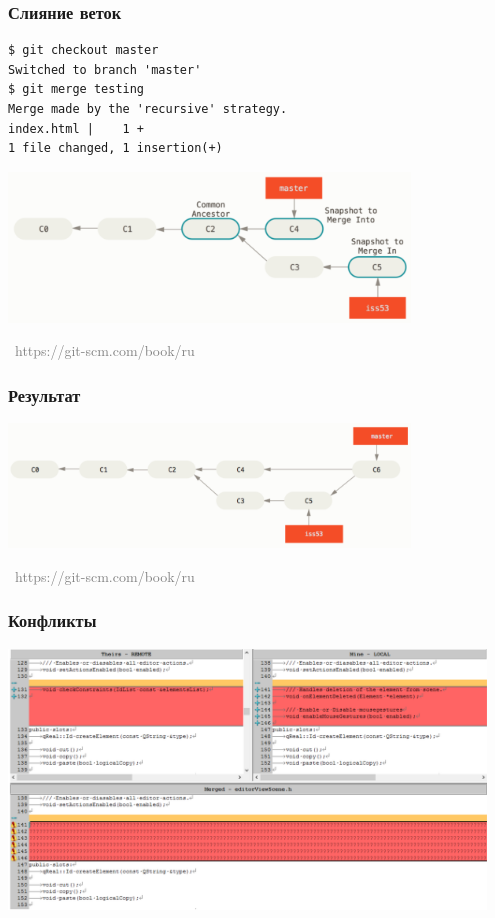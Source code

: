 \documentclass[xetex,mathserif,serif]{beamer}
\newcommand{\attribution}[1] {
\vspace{-5mm}\begin{flushright}\begin{scriptsize}\textcolor{gray}{\textcopyright\, #1}\end{scriptsize}\end{flushright}
}
\begin{document}
	\begin{frame}[fragile]
		\frametitle{Слияние веток}
		\begin{verbatim}
$ git checkout master
Switched to branch 'master'
$ git merge testing
Merge made by the 'recursive' strategy.
index.html |    1 +
1 file changed, 1 insertion(+)
		\end{verbatim}
		\begin{center}
			\includegraphics[width=0.8\textwidth]{merge.png}
			\attribution{https://git-scm.com/book/ru}
		\end{center}
	\end{frame}

	\begin{frame}
		\frametitle{Результат}
		\begin{center}
			\includegraphics[width=0.8\textwidth]{mergeResult.png}
			\attribution{https://git-scm.com/book/ru}
		\end{center}
	\end{frame}

	\begin{frame}
		\frametitle{Конфликты}
		\begin{center}
			\includegraphics[width=0.95\textwidth]{conflicts.png}
		\end{center}
	\end{frame}
\end{document}
